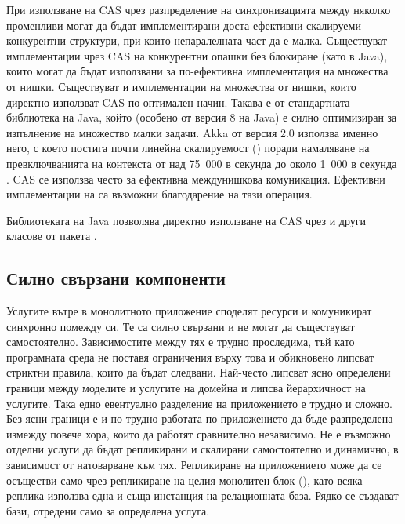 При използване на CAS чрез разпределение на синхронизацията между няколко променливи могат да бъдат имплементирани доста ефективни скалируеми конкурентни структури, при които непаралелната част да е малка. Съществуват имплементации чрез CAS на конкурентни опашки без блокиране (като  в Java), които могат да бъдат използвани за по-ефективна имплементация на множества от нишки. Съществуват и имплементации на множества от нишки, които директно използват CAS по оптимален начин. Такава е  от стандартната библиотека на Java, който (особено от версия 8 на Java) е силно оптимизиран за изпълнение на множество малки задачи. Akka от версия 2.0 използва именно него, с което постига почти линейна скалируемост () поради намаляване на превключванията на контекста от над 75~000 в секунда до около 1~000 в секунда \cite{nordwall2012ForkJoin}. CAS се използва често за ефективна междунишкова комуникация. Ефективни имплементации на  са възможни благодарение на тази операция.

Библиотеката на Java позволява директно използване на CAS чрез  и други класове от пакета .

\subsection{Силно свързани компоненти}

Услугите вътре в монолитното приложение споделят ресурси и комуникират синхронно помежду си. Те са силно свързани и не могат да съществуват самостоятелно. Зависимостите между тях е трудно проследима, тъй като програмната среда не поставя ограничения върху това и обикновено липсват стриктни правила, които да бъдат следвани. Най-често липсват ясно определени граници между моделите и услугите на домейна и липсва йерархичност на услугите. Така едно евентуално разделение на приложението е трудно и сложно. Без ясни граници е и по-трудно работата по приложението да бъде разпределена измежду повече хора, които да работят сравнително независимо. Не е възможно отделни услуги да бъдат репликирани и скалирани самостоятелно и динамично, в зависимост от натоварване към тях. Репликиране на приложението може да се осъществи само чрез репликиране на целия монолитен блок (), като всяка реплика използва една и съща инстанция на релационната база. Рядко се създават бази, отредени само за определена услуга.

